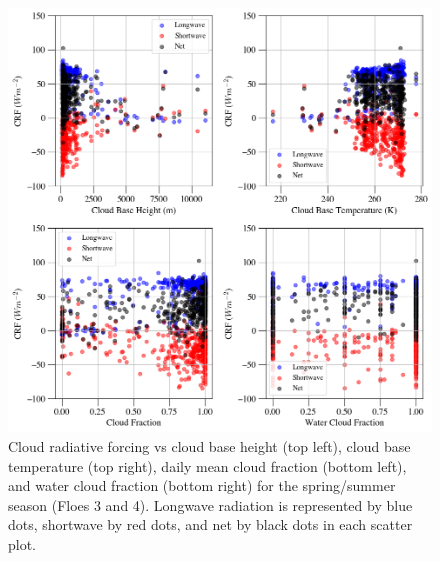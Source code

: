 \begin{figure}[p]
    \centering
    \includegraphics[width=1\linewidth]{figures/chapter4/VSSummer.png}
    \caption[Cloud radiative forcing vs cloud base height, cloud base temperature, cloud fraction, and water cloud fraction for summer.]{Cloud radiative forcing vs cloud base height (top left), cloud base temperature (top right), daily mean cloud fraction (bottom left), and water cloud fraction (bottom right) for the spring/summer season (Floes 3 and 4). Longwave radiation is represented by blue dots, shortwave by red dots, and net by black dots in each scatter plot.}
    \label{fig:spring:crf}
\end{figure}

